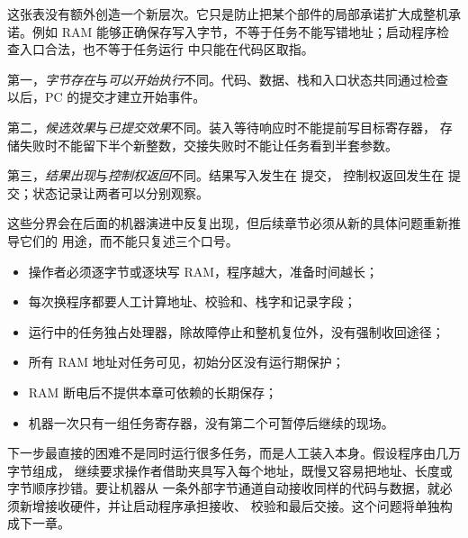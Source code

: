 这张表没有额外创造一个新层次。它只是防止把某个部件的局部承诺扩大成整机承诺。例如 RAM
能够正确保存写入字节，不等于任务不能写错地址；启动程序检查入口合法，也不等于任务运行
中只能在代码区取指。


第一，\emph{字节存在}与\emph{可以开始执行}不同。代码、数据、栈和入口状态共同通过检查
以后，PC 的提交才建立开始事件。

第二，\emph{候选效果}与\emph{已提交效果}不同。装入等待响应时不能提前写目标寄存器，
存储失败时不能留下半个新整数，交接失败时不能让任务看到半套参数。

第三，\emph{结果出现}与\emph{控制权返回}不同。结果写入发生在  提交，
控制权返回发生在  提交；状态记录让两者可以分别观察。

这些分界会在后面的机器演进中反复出现，但后续章节必须从新的具体问题重新推导它们的
用途，而不能只复述三个口号。


\begin{itemize}
\item 操作者必须逐字节或逐块写 RAM，程序越大，准备时间越长；
\item 每次换程序都要人工计算地址、校验和、栈字和记录字段；
\item 运行中的任务独占处理器，除故障停止和整机复位外，没有强制收回途径；
\item 所有 RAM 地址对任务可见，初始分区没有运行期保护；
\item RAM 断电后不提供本章可依赖的长期保存；
\item 机器一次只有一组任务寄存器，没有第二个可暂停后继续的现场。
\end{itemize}

下一步最直接的困难不是同时运行很多任务，而是人工装入本身。假设程序由几万字节组成，
继续要求操作者借助夹具写入每个地址，既慢又容易把地址、长度或字节顺序抄错。要让机器从
一条外部字节通道自动接收同样的代码与数据，就必须新增接收硬件，并让启动程序承担接收、
校验和最后交接。这个问题将单独构成下一章。
